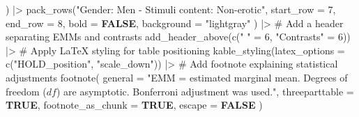 \documentclass[
  bookmarksnumbered]{article}
\newenvironment{Shaded}{\begin{snugshade}}{\end{snugshade}}
\newcommand{\AttributeTok}[1]{\textcolor[rgb]{0.80,0.80,0.80}{#1}}
\newcommand{\CommentTok}[1]{\textcolor[rgb]{0.50,0.62,0.50}{#1}}
\newcommand{\ConstantTok}[1]{\textcolor[rgb]{0.86,0.64,0.64}{\textbf{#1}}}
\newcommand{\DecValTok}[1]{\textcolor[rgb]{0.86,0.86,0.80}{#1}}
\newcommand{\FunctionTok}[1]{\textcolor[rgb]{0.94,0.94,0.56}{#1}}
\newcommand{\NormalTok}[1]{\textcolor[rgb]{0.80,0.80,0.80}{#1}}
\newcommand{\OtherTok}[1]{\textcolor[rgb]{0.94,0.94,0.56}{#1}}
\newcommand{\SpecialCharTok}[1]{\textcolor[rgb]{0.86,0.64,0.64}{#1}}
\newcommand{\StringTok}[1]{\textcolor[rgb]{0.80,0.58,0.58}{#1}}
\begin{document}
\begin{Shaded}
\begin{Highlighting}[]
\NormalTok{  ) }\SpecialCharTok{|\textgreater{}}
  \FunctionTok{pack\_rows}\NormalTok{(}\StringTok{"Gender: Men {-} Stimuli content: Non{-}erotic"}\NormalTok{,}
    \AttributeTok{start\_row =} \DecValTok{7}\NormalTok{, }\AttributeTok{end\_row =} \DecValTok{8}\NormalTok{,}
    \AttributeTok{bold =} \ConstantTok{FALSE}\NormalTok{, }\AttributeTok{background =} \StringTok{"lightgray"}
\NormalTok{  ) }\SpecialCharTok{|\textgreater{}}
  \CommentTok{\# Add a header separating EMMs and contrasts}
  \FunctionTok{add\_header\_above}\NormalTok{(}\FunctionTok{c}\NormalTok{(}\StringTok{" "} \OtherTok{=} \DecValTok{6}\NormalTok{, }\StringTok{"Contrasts"} \OtherTok{=} \DecValTok{6}\NormalTok{)) }\SpecialCharTok{|\textgreater{}}
  \CommentTok{\# Apply LaTeX styling for table positioning}
  \FunctionTok{kable\_styling}\NormalTok{(}\AttributeTok{latex\_options =} \FunctionTok{c}\NormalTok{(}\StringTok{"HOLD\_position"}\NormalTok{, }\StringTok{"scale\_down"}\NormalTok{)) }\SpecialCharTok{|\textgreater{}}
  \CommentTok{\# Add footnote explaining statistical adjustments}
  \FunctionTok{footnote}\NormalTok{(}
    \AttributeTok{general =} \StringTok{"EMM = estimated marginal mean.}
\StringTok{           Degrees of freedom ($df$) are asymptotic.}
\StringTok{           Bonferroni adjustment was used."}\NormalTok{,}
    \AttributeTok{threeparttable =} \ConstantTok{TRUE}\NormalTok{, }\AttributeTok{footnote\_as\_chunk =} \ConstantTok{TRUE}\NormalTok{, }\AttributeTok{escape =} \ConstantTok{FALSE}
\NormalTok{  )}
\end{Highlighting}
\end{Shaded}
\end{document}
